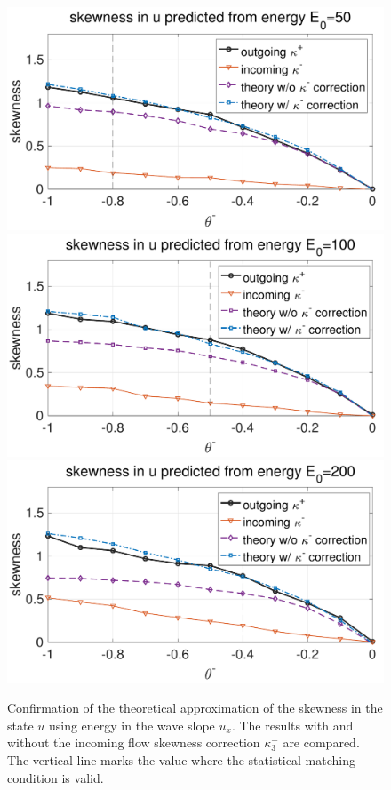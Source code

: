 \documentclass[9pt,twoside,lineno]{pnas-new}
\theoremstyle{plain}
\theoremstyle{plain}
\begin{document}
\begin{figure}
\begin{centering}
\includegraphics[scale=0.28]{./matchTheory_E50}\includegraphics[scale=0.28]{./matchTheory_E100}\includegraphics[scale=0.28]{./matchTheory_E200}
\par\end{centering}
\caption{Confirmation of the theoretical approximation of the skewness in the
state $u$ using energy in the wave slope $u_{x}$. The results with
and without the incoming flow skewness correction $\kappa_{3}^{-}$
are compared. The vertical line marks the value where the statistical
matching condition is valid.\label{fig:Confirmation} }
\end{figure}
\end{document}
